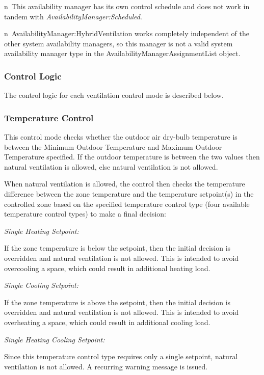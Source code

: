 n~This availability manager has its own control schedule and does not work in tandem with \emph{AvailabilityManager:Scheduled}.

n~AvailabilityManager:HybridVentilation works completely independent of the other system availability managers, so this manager is not a valid system availability manager type in the AvailabilityManagerAssignmentList object.

\subsubsection{Control Logic}\label{control-logic-000}

The control logic for each ventilation control mode is described below.

\subsubsection{Temperature Control}\label{temperature-control}

This control mode checks whether the outdoor air dry-bulb temperature is between the Minimum Outdoor Temperature and Maximum Outdoor Temperature specified. If the outdoor temperature is between the two values then natural ventilation is allowed, else natural ventilation is not allowed.

When natural ventilation is allowed, the control then checks the temperature difference between the zone temperature and the temperature setpoint(s) in the controlled zone based on the specified temperature control type (four available temperature control types) to make a final decision:

\emph{Single Heating Setpoint:}

If the zone temperature is below the setpoint, then the initial decision is overridden and natural ventilation is not allowed. This is intended to avoid overcooling a space, which could result in additional heating load.

\emph{Single Cooling Setpoint:}

If the zone temperature is above the setpoint, then the initial decision is overridden and natural ventilation is not allowed. This is intended to avoid overheating a space, which could result in additional cooling load.

\emph{Single Heating Cooling Setpoint:}

Since this temperature control type requires only a single setpoint, natural ventilation is not allowed. A recurring warning message is issued.

